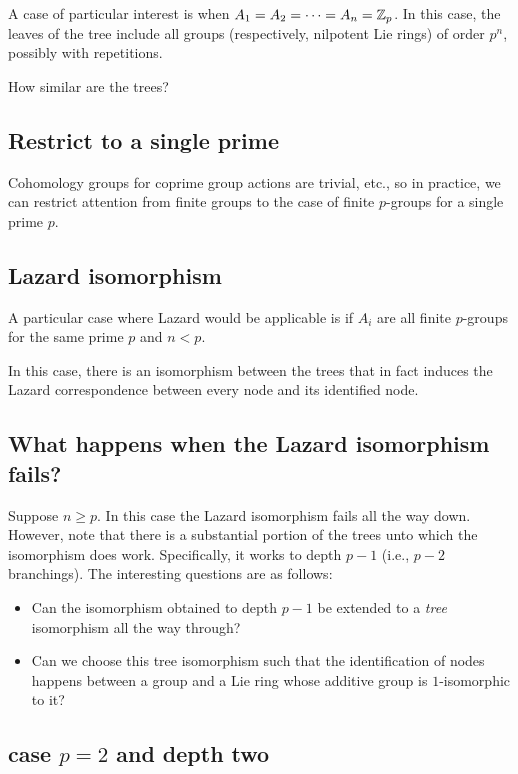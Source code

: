 \documentclass[10pt]{amsart}
\begin{document}
A case of particular interest is when $A_1 = A_2 = \dots = A_n =
\mathbb{Z}_p$. In this case, the leaves of the tree include all groups
(respectively, nilpotent Lie rings) of order $p^n$, possibly with
repetitions.

How similar are the trees?


\subsection{Restrict to a single prime}

Cohomology groups for coprime group actions are trivial, etc., so in
practice, we can restrict attention from finite groups to the case of
finite $p$-groups for a single prime $p$.

\subsection{Lazard isomorphism}

A particular case where Lazard would be applicable is if $A_i$ are all
finite $p$-groups for the same prime $p$ and $n < p$.

In this case, there is an isomorphism between the trees that in fact
induces the Lazard correspondence between every node and its
identified node.

\subsection{What happens when the Lazard isomorphism fails?}

Suppose $n \ge p$. In this case the Lazard isomorphism fails all the
way down. However, note that there is a substantial portion of the
trees unto which the isomorphism does work. Specifically, it works to
depth $p - 1$ (i.e., $p -2$ branchings). The interesting
questions are as follows:

\begin{itemize}
\item Can the isomorphism obtained to depth $p - 1$ be extended to a
  {\em tree} isomorphism all the way through?
\item Can we choose this tree isomorphism such that the identification
  of nodes happens between a group and a Lie ring whose additive group
  is $1$-isomorphic to it?
\end{itemize}

\subsection{case $p = 2$ and depth two}
\end{document}
